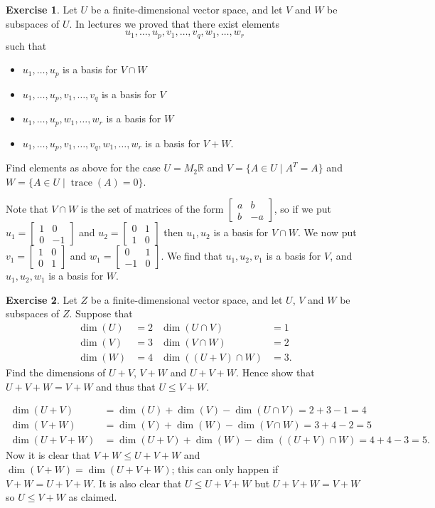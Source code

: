 \documentclass{amsart}
\newcommand{\R}         {{\mathbb{R}}}
\newcommand{\trc}       {\operatorname{trace}}
\newcommand{\bsm}       {\left[\begin{smallmatrix}}
\newcommand{\esm}       {\end{smallmatrix}\right]}
\newcommand{\st}        {\;|\;}
\renewcommand{\:}       {\colon}
\theoremstyle{definition}
\newtheorem{exercise}{Exercise}[section]
\renewenvironment{solution}{\SolutionAtEnd}{\endSolutionAtEnd}
\begin{document}
\begin{exercise}
 Let $U$ be a finite-dimensional vector space, and let $V$
 and $W$ be subspaces of $U$.  In lectures we proved that
 there exist elements
 \[ u_1,\dotsc,u_p,v_1,\dotsc,v_q,w_1,\dotsc,w_r \]
 such that
 \begin{itemize}
  \item $u_1,\dotsc,u_p$ is a basis for $V\cap W$
  \item $u_1,\dotsc,u_p,v_1,\dotsc,v_q$ is a basis for $V$
  \item $u_1,\dotsc,u_p,w_1,\dotsc,w_r$ is a basis for $W$
  \item $u_1,\dotsc,u_p,v_1,\dotsc,v_q,w_1,\dotsc,w_r$ is a basis for $V+W$. 
 \end{itemize}
 Find elements as above for the case $U=M_2\R$
 and $V=\{A\in U\st A^T=A\}$ and $W=\{A\in U\st\trc(A)=0\}$. 
\end{exercise} 
\begin{solution}
 Note that $V\cap W$ is the set of matrices of the form
 $\bsm a&b\\ b&-a\esm$, so if we put
 $u_1=\bsm 1&0\\0&-1\esm$ and $u_2=\bsm 0&1\\1&0\esm$ then
 $u_1,u_2$ is a basis for $V\cap W$.  We now put $v_1=\bsm
 1&0\\0&1\esm$ and $w_1=\bsm 0&1\\-1&0\esm$.  We find that
 $u_1,u_2,v_1$ is a basis for $V$, and $u_1,u_2,w_1$ is a
 basis for $W$.
\end{solution}

\begin{exercise}
 Let $Z$ be a finite-dimensional vector space, and let $U$,
 $V$ and $W$ be subspaces of $Z$.  Suppose that
 \begin{align*}
  \dim(U) &= 2  & \dim(U\cap V) &= 1 \\
  \dim(V) &= 3  & \dim(V\cap W) &= 2 \\
  \dim(W) &= 4  & \dim((U+V)\cap W) &= 3.
 \end{align*}
 Find the dimensions of $U+V$, $V+W$ and $U+V+W$.  Hence
 show that $U+V+W=V+W$ and thus that $U\leq V+W$.
\end{exercise}
\begin{solution}
 \begin{align*}
  \dim(U+V) &= \dim(U)+\dim(V)-\dim(U\cap V)=2+3-1=4\\
  \dim(V+W) &= \dim(V)+\dim(W)-\dim(V\cap W)=3+4-2=5\\
  \dim(U+V+W) &= \dim(U+V)+\dim(W)-\dim((U+V)\cap W)
               = 4+4-3=5.
 \end{align*}
 Now it is clear that $V+W\leq U+V+W$ and
 $\dim(V+W)=\dim(U+V+W)$; this can only happen if
 $V+W=U+V+W$.  It is also clear that $U\leq U+V+W$ but
 $U+V+W=V+W$ so $U\leq V+W$ as claimed.
\end{solution}
\end{document}
